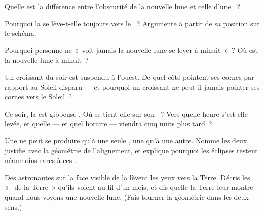 \begin{exercise}[$\star$]\label{exo:g7:moon-phases:5}
Quelle est la différence entre l'obscurité de la nouvelle lune et
celle d'une ~?
\end{exercise}

\begin{exercise}[$\star$]\label{exo:g7:moon-phases:6}
Pourquoi la  se lève-t-elle toujours vers le ~? Argumente à partir de sa position sur le schéma.
\end{exercise}

\begin{exercise}[$\star$]\label{exo:g7:moon-phases:7}
Pourquoi personne ne «~voit jamais la nouvelle lune se lever à
minuit~»~? Où est la nouvelle lune à minuit~?
\end{exercise}

\begin{exercise}[$\star$]\label{exo:g7:moon-phases:8}
Un croissant du soir est suspendu à l'ouest. De quel côté pointent
ses cornes par rapport au Soleil disparu --- et pourquoi un croissant
ne peut-il jamais pointer ses cornes vers le Soleil~?
\end{exercise}

\begin{exercise}[$\star\star$]\label{exo:g7:moon-phases:9}
Ce soir, la  est gibbeuse . Où se tient-elle sur son
~? Vers quelle heure s'est-elle levée, et quelle  --- et
quel horaire --- viendra cinq nuits plus tard~?
\end{exercise}

\begin{exercise}[$\star\star$]\label{exo:g7:moon-phases:10}
Une  ne peut se produire qu'à une seule , une
 qu'à une autre. Nomme les deux, justifie avec la
géométrie de l'alignement, et explique pourquoi les éclipses restent
néanmoins rares à ces .
\end{exercise}

\begin{exercise}[$\star\star$]\label{exo:g7:moon-phases:11}
Des astronautes sur la face visible de la  lèvent les yeux vers
la Terre. Décris les «~ de la Terre~» qu'ils voient au fil d'un
mois, et dis quelle  la Terre leur montre quand nous voyons une
nouvelle lune. (Fais tourner la géométrie dans les deux sens.)
\end{exercise}

